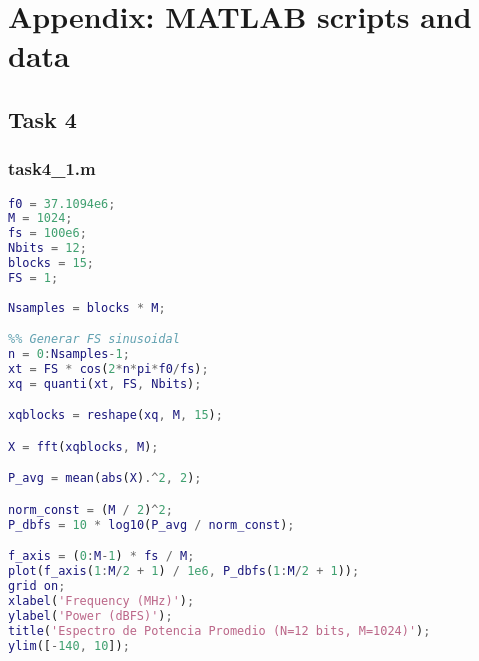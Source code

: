 \appendix
\section{Appendix: MATLAB scripts and data}
\label{app:matlab}

\subsection{Task 4}
\subsubsection{task4\_1.m}

\begin{lstlisting}[language=Matlab]
f0 = 37.1094e6;
M = 1024;
fs = 100e6;
Nbits = 12;
blocks = 15;
FS = 1;
                                                                                                                                                                                                                                                                                                                                                                                                                                                                                                                                                                                                                                                    
Nsamples = blocks * M;

%% Generar FS sinusoidal
n = 0:Nsamples-1;
xt = FS * cos(2*n*pi*f0/fs);
xq = quanti(xt, FS, Nbits);

xqblocks = reshape(xq, M, 15);

X = fft(xqblocks, M);

P_avg = mean(abs(X).^2, 2);

norm_const = (M / 2)^2;
P_dbfs = 10 * log10(P_avg / norm_const);

f_axis = (0:M-1) * fs / M; 
plot(f_axis(1:M/2 + 1) / 1e6, P_dbfs(1:M/2 + 1));
grid on;
xlabel('Frequency (MHz)');
ylabel('Power (dBFS)');
title('Espectro de Potencia Promedio (N=12 bits, M=1024)');
ylim([-140, 10]);
\end{lstlisting}


